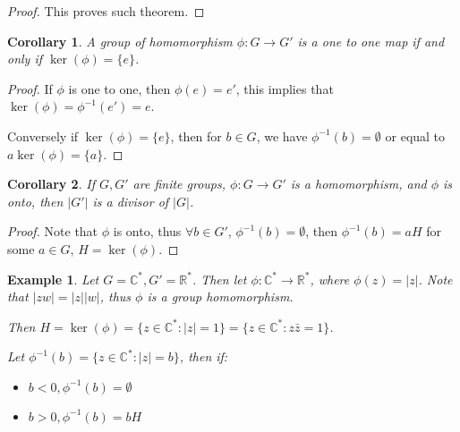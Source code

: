 \documentclass{article}
\theoremstyle{MyNonumberplain}
\theoremstyle{break}
\newtheorem*{proof}{Proof. }
\newcommand{\p}{\phi}
\theoremstyle{break}
\newtheorem{corollary}{Corollary}[theorem]
\newtheorem{example}{Example}[section]
\theoremstyle{break}
\theoremstyle{definition}
\theoremstyle{break}
\begin{document}
\begin{thmbox}
\begin{prfbox}
\begin{proof}
                    This proves such theorem.
                \end{proof}
            \end{prfbox}
\end{thmbox}

\begin{thmbox}
    \begin{corollary}
        A group of homomorphism $\p : G \rightarrow G'$ is a one to one map if and only if $\ker
        \left( \p \right) = \{ e \}$.
    \end{corollary}
    \begin{prfbox}
        \begin{proof}
            If $\p$ is one to one, then $\p (e) = e'$, this implies that $ \ker \left( \p
            \right) = \p^{- 1} (e') = e$.\bigskip

            Conversely if $\ker \left( \p \right) = \{ e \}$, then for $b \in G$, we have
            $\p^{- 1} (b) = \emptyset$ or equal to $a \ker \left( \p \right) = \{ a \}$.
        \end{proof}
    \end{prfbox}
\end{thmbox}

\begin{thmbox}
    \begin{corollary}
        If $G, G'$ are finite groups, $\p : G \rightarrow G'$ is a homomorphism, and
        $\p$ is onto, then $| G' |$ is a divisor of $| G |$.
    \end{corollary}
    \begin{prfbox}
        \begin{proof}
            Note that $\p$ is onto, thus $\forall b \in G'$, $\p^{- 1} (b) = \emptyset$,
            then $\p^{- 1} (b) = a H$ for some $a \in G$, $H = \ker \left( \p \right)$.
        \end{proof}
    \end{prfbox}
\end{thmbox}


\begin{expbox}
    \begin{example}
        Let $G =\mathbb{C}^{\ast}, G' =\mathbb{R}^{\ast}$. Then let $\p :
        \mathbb{C}^{\ast} \rightarrow \mathbb{R}^{\ast}$, where $\p (z) = | z |$. Note
        that $| z w | = | z | | w |$, thus $\p$ is a group homomorphism.\bigskip

        Then $H = \ker \left( \p \right) = \{ z \in \mathbb{C}^{\ast} : | z | = 1 \}
        = \{ z \in \mathbb{C}^{\ast} : z \bar{z} = 1 \}$.\bigskip

        Let $\p^{- 1} (b) = \{ z \in \mathbb{C}^{\ast} : | z | = b \}$, then if:\bigskip
        \begin{itemize}
        \item $b < 0, \p^{- 1} (b) = \emptyset$\bigskip
        
        \item $b > 0, \p^{- 1} (b) = b H$
        \end{itemize}
    \end{example}
\end{expbox}
\end{document}
